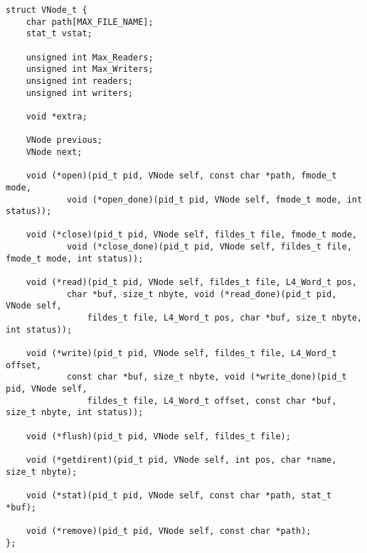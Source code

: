 \documentclass[12pt,english]{article}
\begin{document}
\begin{verbatim}
struct VNode_t {
	char path[MAX_FILE_NAME];
	stat_t vstat;

	unsigned int Max_Readers;
	unsigned int Max_Writers;
	unsigned int readers;
	unsigned int writers;
	
	void *extra; 

	VNode previous;
	VNode next;

	void (*open)(pid_t pid, VNode self, const char *path, fmode_t mode,
			void (*open_done)(pid_t pid, VNode self, fmode_t mode, int status));

	void (*close)(pid_t pid, VNode self, fildes_t file, fmode_t mode,
			void (*close_done)(pid_t pid, VNode self, fildes_t file, fmode_t mode, int status));

	void (*read)(pid_t pid, VNode self, fildes_t file, L4_Word_t pos,
			char *buf, size_t nbyte, void (*read_done)(pid_t pid, VNode self,
				fildes_t file, L4_Word_t pos, char *buf, size_t nbyte, int status));

	void (*write)(pid_t pid, VNode self, fildes_t file, L4_Word_t offset,
			const char *buf, size_t nbyte, void (*write_done)(pid_t pid, VNode self,
				fildes_t file, L4_Word_t offset, const char *buf, size_t nbyte, int status));

	void (*flush)(pid_t pid, VNode self, fildes_t file);

	void (*getdirent)(pid_t pid, VNode self, int pos, char *name, size_t nbyte);

	void (*stat)(pid_t pid, VNode self, const char *path, stat_t *buf);

	void (*remove)(pid_t pid, VNode self, const char *path);
};
\end{verbatim}
\end{document}
